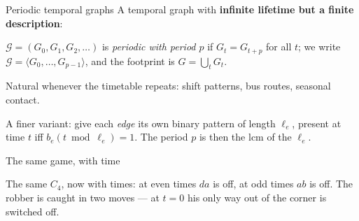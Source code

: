 \documentclass[10pt, compress]{beamer}
\begin{document}
\begin{frame}{Periodic temporal graphs}
A temporal graph with \textbf{infinite lifetime but a finite description}:

\medskip

$\mathcal{G} = (G_0, G_1, G_2, \dots)$ is \emph{periodic with period $p$} if $G_t = G_{t+p}$ for all $t$; we write $\mathcal{G} = \langle G_0, \dots, G_{p-1}\rangle$, and the footprint is $G = \bigcup_t G_t$.

\begin{center}
\end{center}

Natural whenever the timetable repeats: shift patterns, bus routes, seasonal contact.

\medskip

{\small A finer variant: give each \emph{edge} its own binary pattern of length $\ell_e$, present at time $t$ iff $b_e(t \bmod \ell_e) = 1$. The period $p$ is then the $\mathrm{lcm}$ of the $\ell_e$.}
\end{frame}


\begin{frame}{The same game, with time}
\begin{center}
\resizebox{0.92\linewidth}{!}{}
\end{center}

\medskip

{\small The same $C_4$, now with times: at even times $da$ is off, at odd times $ab$ is off. The robber is caught in two moves --- at $t=0$ his only way out of the corner is switched off.}
\end{frame}
\end{document}
